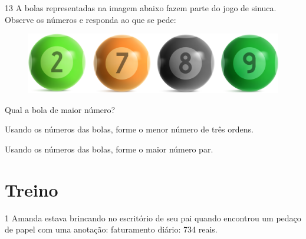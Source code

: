 

\num{13} A bolas representadas na imagem abaixo fazem parte do jogo de sinuca. Observe os números e responda ao que se pede:

\begin{figure}[htpb!]
\centering
\includegraphics[width=.7\textwidth]{./media/image7.png}
\end{figure}

\begin{escolha}
\item Qual a bola de maior número?

\item Usando os números das bolas, forme o menor número de três ordens. 

\item Usando os números das bolas, forme o maior número par.

\end{escolha}


\pagebreak

\section*{Treino}

\num{1} Amanda estava brincando no escritório de seu pai quando
encontrou um pedaço de papel com uma anotação: faturamento diário: 734 reais.

